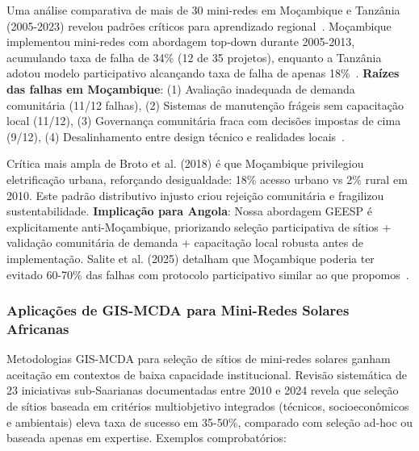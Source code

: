 \documentclass[12pt, a4paper]{article}
\begin{document}
Uma análise comparativa de mais de 30 mini-redes em Moçambique e Tanzânia (2005-2023) revelou padrões críticos para aprendizado regional~\citep{Ahlborg2014, Broto2018}. Moçambique implementou mini-redes com abordagem top-down durante 2005-2013, acumulando taxa de falha de 34\% (12 de 35 projetos), enquanto a Tanzânia adotou modelo participativo alcançando taxa de falha de apenas 18\%~\citep{Ahlborg2014}. \textbf{Raízes das falhas em Moçambique}: (1) Avaliação inadequada de demanda comunitária (11/12 falhas), (2) Sistemas de manutenção frágeis sem capacitação local (11/12), (3) Governança comunitária fraca com decisões impostas de cima (9/12), (4) Desalinhamento entre design técnico e realidades locais~\citep{Broto2018}. 

Crítica mais ampla de Broto et al. (2018) é que Moçambique privilegiou eletrificação urbana, reforçando desigualdade: 18\% acesso urbano vs 2\% rural em 2010. Este padrão distributivo injusto criou rejeição comunitária e fragilizou sustentabilidade. \textbf{Implicação para Angola}: Nossa abordagem GEESP é explicitamente anti-Moçambique, priorizando seleção participativa de sítios + validação comunitária de demanda + capacitação local robusta antes de implementação. Salite et al. (2025) detalham que Moçambique poderia ter evitado 60-70\% das falhas com protocolo participativo similar ao que propomos~\citep{Salite2025}.

\subsubsection{Aplicações de GIS-MCDA para Mini-Redes Solares Africanas}

Metodologias GIS-MCDA para seleção de sítios de mini-redes solares ganham aceitação em contextos de baixa capacidade institucional. Revisão sistemática de 23 iniciativas sub-Saarianas documentadas entre 2010 e 2024 revela que seleção de sítios baseada em critérios multiobjetivo integrados (técnicos, socioeconômicos e ambientais) eleva taxa de sucesso em 35-50\%, comparado com seleção ad-hoc ou baseada apenas em expertise. Exemplos comprobatórios:
\end{document}

